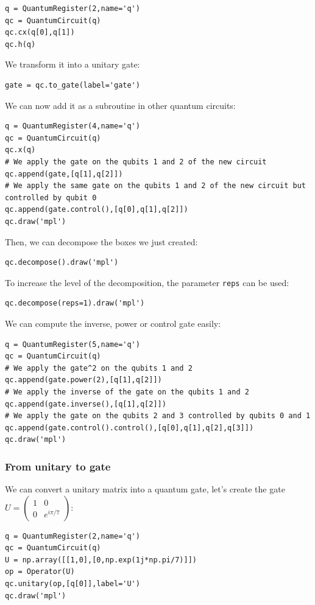 \documentclass{article}
\begin{document}
\begin{verbatim}
q = QuantumRegister(2,name='q')
qc = QuantumCircuit(q)
qc.cx(q[0],q[1])
qc.h(q)
\end{verbatim}
We transform it into a unitary gate:
\begin{verbatim}
gate = qc.to_gate(label='gate')
\end{verbatim}
We can now add it as a subroutine in other quantum circuits:
\begin{verbatim}
q = QuantumRegister(4,name='q')
qc = QuantumCircuit(q)
qc.x(q)
# We apply the gate on the qubits 1 and 2 of the new circuit
qc.append(gate,[q[1],q[2]])
# We apply the same gate on the qubits 1 and 2 of the new circuit but controlled by qubit 0
qc.append(gate.control(),[q[0],q[1],q[2]])
qc.draw('mpl')
\end{verbatim}
Then, we can decompose the boxes we just created:
\begin{verbatim}
qc.decompose().draw('mpl')
\end{verbatim}
To increase the level of the decomposition, the parameter \verb|reps| can be used:
\begin{verbatim}
qc.decompose(reps=1).draw('mpl')
\end{verbatim}
We can compute the inverse, power or control gate easily:
\begin{verbatim}
q = QuantumRegister(5,name='q')
qc = QuantumCircuit(q)
# We apply the gate^2 on the qubits 1 and 2
qc.append(gate.power(2),[q[1],q[2]])
# We apply the inverse of the gate on the qubits 1 and 2
qc.append(gate.inverse(),[q[1],q[2]])
# We apply the gate on the qubits 2 and 3 controlled by qubits 0 and 1
qc.append(gate.control().control(),[q[0],q[1],q[2],q[3]])
qc.draw('mpl')
\end{verbatim}
\subsubsection{From unitary to gate}
We can convert a unitary matrix into a quantum gate, let's create the gate $U=\begin{pmatrix}
    1 & 0 \\ 0 & e^{i\pi/7}
\end{pmatrix}$:
\begin{verbatim}
q = QuantumRegister(2,name='q')
qc = QuantumCircuit(q)
U = np.array([[1,0],[0,np.exp(1j*np.pi/7)]])
op = Operator(U)
qc.unitary(op,[q[0]],label='U')
qc.draw('mpl')
\end{verbatim}
\end{document}
